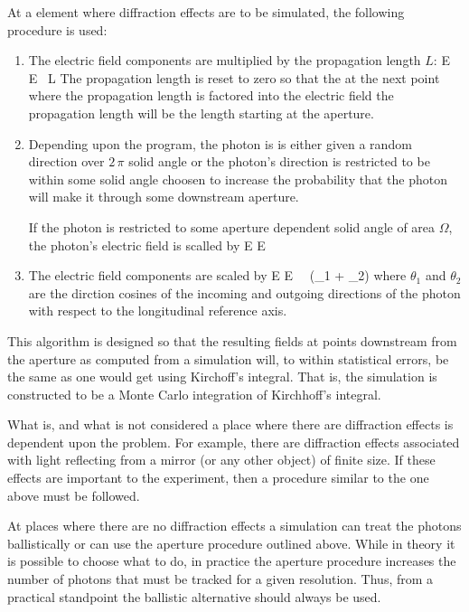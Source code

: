 At a  element where diffraction effects are to
be simulated, the following procedure is used:
  \begin{enumerate}
  \item
The electric field components are multiplied by the propagation length $L$:
\Begineq
  E \rightarrow E \, L
\Endeq
The propagation length is reset to zero so that the at the next point
where the propagation length is factored into the electric field the
propagation length will be the length starting at the aperture.
  \item
Depending upon the program, the photon is is either given a random
direction over $2 \, \pi$ solid angle or the photon's direction
is restricted to be within some solid angle choosen to increase
the probability that the photon will make it through some downstream aperture.

If the photon is restricted to some aperture dependent solid angle of area $\Omega$,
the photon's electric field is scalled by
\Begineq
  E \rightarrow E \, 
  \label{eeo4p}
\Endeq

  \item
The electric field components are scaled by
\Begineq
  E \rightarrow E \,  \, (\cos\theta_1 + \cos\theta_2)
  \label{eek4p}
\Endeq
where $\theta_1$ and $\theta_2$ are the dirction cosines of the
incoming and outgoing directions of the photon with respect to the
longitudinal reference axis.
  \end{enumerate}
This algorithm is designed so that the resulting fields at points
downstream from the aperture as computed from a simulation will, to
within statistical errors, be the same as one would get using
Kirchoff's integral. That is, the simulation is constructed to be a
Monte Carlo integration of Kirchhoff's integral.

What is, and what is not considered a place where there are
diffraction effects is dependent upon the problem. For example, there
are diffraction effects associated with light reflecting from a mirror
(or any other object) of finite size. If these effects are important
to the experiment, then a procedure similar to the one above must be
followed. 

At places where there are no diffraction effects a simulation can
treat the photons ballistically or can use the aperture procedure
outlined above. While in theory it is possible to choose what to do, in
practice the aperture procedure increases the number of photons that
must be tracked for a given resolution. Thus, from a practical standpoint
the ballistic alternative should always be used.

